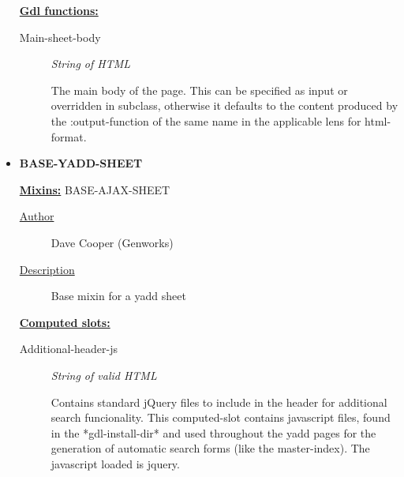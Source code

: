 \documentclass [11pt]{book}
\begin{document}
\begin{itemize}
\begin{description}
\end{description}






\textbf{
\underline{Gdl functions:}}

\begin{description}

\item [Main-sheet-body]
\emph{String of HTML}

 The main body of the page.
This can be specified as input or overridden in subclass, otherwise it defaults
to the content produced by the :output-function of the same name
in the applicable lens for  html-format.




\end{description}







\item {}
\textbf{BASE-YADD-SHEET}


\textbf{
\underline{Mixins:}} BASE-AJAX-SHEET





\begin{description}

\item [
\underline{Author}]


Dave Cooper (Genworks)



\item [
\underline{Description}]


Base mixin for a yadd sheet



\end{description}








\textbf{
\underline{Computed slots:}}

\begin{description}

\item [Additional-header-js]
\emph{String of valid HTML}

 Contains standard jQuery files to include
in the header for additional search funcionality.  This computed-slot
contains javascript files, found in the *gdl-install-dir* and used
throughout the yadd pages for the generation of automatic search
forms (like the master-index).  The javascript loaded is jquery.





\end{description}
\end{itemize}
\end{document}

